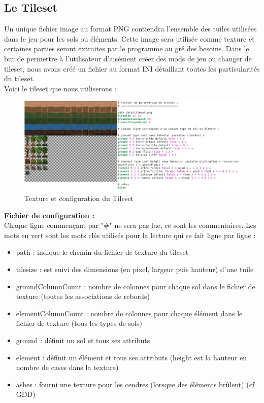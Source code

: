 \documentclass[a4paper]{memoir}
\begin{document}
			\subsection{Le Tileset}
				\label{TilesetDev}
				Un unique fichier image au format PNG contiendra l'ensemble des tuiles utilisées dans le jeu pour les sols ou éléments. Cette image sera utilisée comme texture et certaines parties seront extraites par le programme au gré des besoins.
				Dans le but de permettre à l'utilisateur d'aisément créer des mods de jeu ou changer de tileset, nous avons créé un fichier au format INI détaillant toutes les particularités du tileset.\\
				Voici le tileset que nous utiliserons :\\
				\begin{figure}[H]
					\begin{center}
						\includegraphics[scale=0.35]{img/TilesetPngIni.png}
					\end{center}
					\label{fig:tileset}
					\caption{Texture et configuration du Tileset}
				\end{figure}
				\textbf{Fichier de configuration :}\\
				Chaque ligne commençant par "\#" ne sera pas lue, ce sont les commentaires. Les mots en vert sont les mots clés utilisés pour la lecture qui se fait ligne par ligne :\\
				\begin{itemize}[label=$\bullet$]
					\item path : indique le chemin du fichier de texture du tileset\\
					\item tilesize : est suivi des dimensions (en pixel, largeur puis hauteur) d'une tuile\\
					\item groundColumnCount : nombre de colonnes pour chaque sol dans le fichier de texture (toutes les associations de rebords)\\
					\item elementColumnCount : nombre de colonnes pour chaque élément dans le fichier de texture (tous les types de sols)\\
					\item ground : définit un sol et tous ses attributs\\
					\item element : définit un élément et tous ses attributs (height est la hauteur en nombre de cases dans la texture)\\
					\item ashes : fourni une texture pour les cendres (lorsque des éléments brûlent) (cf GDD)
				\end{itemize}
\end{document}
